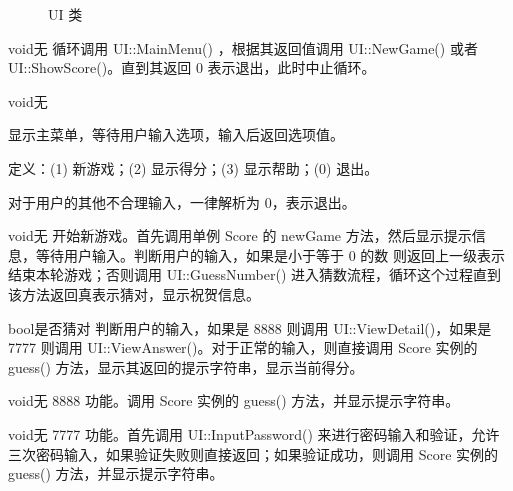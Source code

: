 \begin{figure}[htp]
  \pictext\small
{}
  \caption{\label{UI}UI 类}
\end{figure}

{}
{void}{无}
{循环调用 UI::MainMenu() ，根据其返回值调用 UI::NewGame() 或者 UI::ShowScore()。直到其返回 0 表示退出，此时中止循环。}

{}
{void}{无}
{显示主菜单，等待用户输入选项，输入后返回选项值。

定义：(1) 新游戏；(2) 显示得分；(3) 显示帮助；(0) 退出。

对于用户的其他不合理输入，一律解析为 0，表示退出。}

{}
{void}{无}
{开始新游戏。首先调用单例 Score 的 newGame 方法，然后显示提示信息，等待用户输入。判断用户的输入，如果是小于等于 0 的数 则返回上一级表示结束本轮游戏；否则调用 UI::GuessNumber() 进入猜数流程，循环这个过程直到该方法返回真表示猜对，显示祝贺信息。}

{}
{bool}{是否猜对}
{判断用户的输入，如果是 8888 则调用 UI::ViewDetail()，如果是 7777 则调用 UI::ViewAnswer()。对于正常的输入，则直接调用 Score 实例的 guess() 方法，显示其返回的提示字符串，显示当前得分。}

{}
{void}{无}
{8888 功能。调用 Score 实例的 guess() 方法，并显示提示字符串。}

{}
{void}{无}
{7777 功能。首先调用 UI::InputPassword() 来进行密码输入和验证，允许三次密码输入，如果验证失败则直接返回；如果验证成功，则调用 Score 实例的 guess() 方法，并显示提示字符串。}

